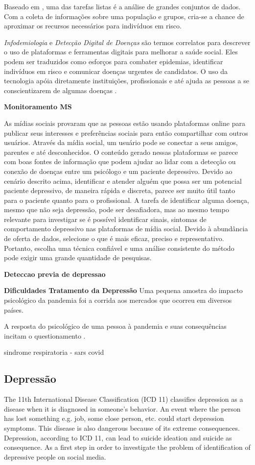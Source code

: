 \documentclass[11pt, notitlepage]{article} %
\begin{document}
Baseado em \cite{info:doi/10.2196/19866}, uma das tarefas listas é a análise de grandes conjuntos de dados. Com a coleta de informações sobre uma população e grupos, cria-se a chance de aproximar os recursos necessários para indivíduos em risco. 

\textit{Infodemiologia} e \textit{Detecção Digital de Doenças} são termos correlatos para descrever o uso de plataformas e ferramentas digitais para melhorar a saúde social. Eles podem ser traduzidos como esforços para combater epidemias, identificar indivíduos em risco e comunicar doenças urgentes de candidatos. O uso da tecnologia apóia diretamente instituições, profissionais e até ajuda as pessoas a se conscientizarem de algumas doenças \cite{Horvitz}.


\textbf{Monitoramento MS}

As mídias sociais provaram que as pessoas estão usando plataformas online para publicar seus interesses e preferências sociais para então compartilhar com outros usuários.
Através da mídia social, um usuário pode se conectar a seus amigos, parentes e até desconhecidos.
O conteúdo gerado nessas plataformas se parece com boas fontes de informação que podem ajudar ao lidar com a detecção ou conexão de doenças entre um psicólogo e um paciente depressivo.
Devido ao cenário descrito acima, identificar e atender alguém que possa ser um potencial paciente depressivo, de maneira rápida e discreta, parece ser muito útil tanto para o paciente quanto para o profissional.
A tarefa de identificar alguma doença, mesmo que não seja depressão, pode ser desafiadora, mas ao mesmo tempo relevante para investigar se é possível identificar sinais, sintomas de comportamento depressivo nas plataformas de mídia social.
Devido à abundância de oferta de dados, selecione o que é mais eficaz, preciso e representativo. Portanto, escolha uma técnica confiável e uma análise consistente do método pode exigir uma grande quantidade de pesquisas.


\textbf{Deteccao previa de depressao}

\textbf{Dificuldades Tratamento da Depressão}
Uma pequena amostra do impacto psicológico da pandemia foi a corrida aos mercados que ocorreu em diversos países.  


A resposta do psicológico de uma pessoa à pandemia e suas consequências incitam o questionamento  .

sindrome respiratoria - sars
covid


\subsection*{Depressão}
The 11th International Disease Classification (ICD 11) classifies depression as a disease when it is diagnosed in someone’s behavior. An event where the person has lost something e.g. job, some close person, etc. could start depression symptoms. This disease is also dangerous because of its extreme consequences. Depression, according to ICD 11, can lead to suicide ideation and suicide as consequence\cite{american2013diagnostic}.
As a first step in order to investigate the problem of identification of depressive people on social media.
\end{document}
